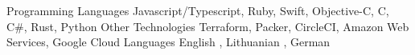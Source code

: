 

\begin{cvskills}

  \medskip
  \cvskill
    {Programming Languages} %
    {Javascript/Typescript, Ruby, Swift, Objective-C, C, C\#, Rust, Python} %
  \medskip
  \cvskill
    {Other Technologies} %
    {Terraform, Packer, CircleCI, Amazon Web Services, Google Cloud} %
  \medskip
  \cvskill
    {Languages} %
    {English \textit{\color{gray}{(fluent)}}, Lithuanian \textit{\color{gray}{(native)}}, German \textit{\color{gray}{(basic)}}} %
\end{cvskills}
